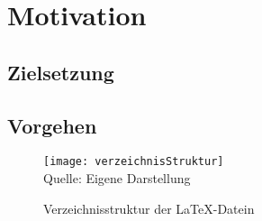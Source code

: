 \section{Motivation}

\subsection{Zielsetzung}

\subsection{Vorgehen}

\begin{figure}[H]
\caption{Verzeichnisstruktur der \LaTeX{}-Datein}\label{fig:verzeichnisStruktur}
\texttt{[image: verzeichnisStruktur]}
\\
Quelle: Eigene Darstellung
\end{figure}
